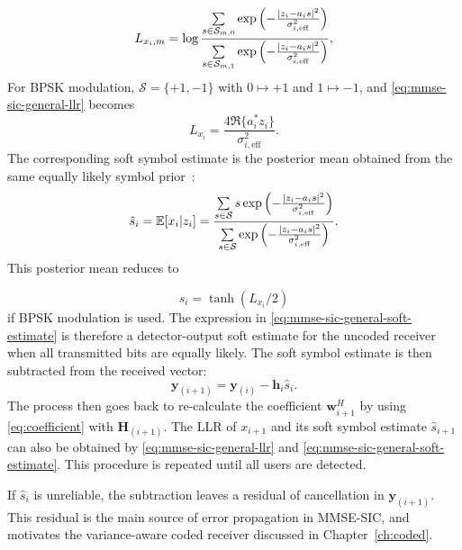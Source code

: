 \begin{equation}
    L_{x_i,m}
    =
    \log
    \frac{
    \sum\limits_{s\in\mathcal{S}_{m,0}}
    \exp\left(-\frac{\abs{z_i-a_i s}^2}{\sigma^2_{i,\mathrm{eff}}}\right)}
    {\sum\limits_{s\in\mathcal{S}_{m,1}}
    \exp\left(-\frac{\abs{z_i-a_i s}^2}{\sigma^2_{i,\mathrm{eff}}}\right)},
    \label{eq:mmse-sic-general-llr}
\end{equation}
For BPSK modulation, $\mathcal{S}=\{+1,-1\}$ with $0\mapsto +1$ and $1\mapsto -1$, and \eqref{eq:mmse-sic-general-llr} becomes
\begin{equation}
    L_{x_i}
    =
    \frac{4\Re\{a_i^* z_i\}}{\sigma^2_{i,\mathrm{eff}}}.
\end{equation}
The corresponding soft symbol estimate is the posterior mean obtained from the same equally likely symbol prior~\cite{shapiro2005soft}:
\begin{equation}
    \hat{s}_i
    =
    \mathbb{E}[x_i|z_i]
    =
    \frac{
    \sum\limits_{s\in\mathcal{S}} s
    \exp\left(-\frac{\abs{z_i-a_i s}^2}{\sigma^2_{i,\mathrm{eff}}}\right)}
    {
    \sum\limits_{s\in\mathcal{S}}
    \exp\left(-\frac{\abs{z_i-a_i s}^2}{\sigma^2_{i,\mathrm{eff}}}\right)}.
    \label{eq:mmse-sic-general-soft-estimate}
\end{equation}
This posterior mean reduces to

\begin{equation}
\hat{s}_i=\tanh(L_{x_i}/2)
\end{equation}
if BPSK modulation is used. 
The expression in \eqref{eq:mmse-sic-general-soft-estimate} is therefore a detector-output soft estimate for the uncoded receiver when all transmitted bits are equally likely. 
The soft symbol estimate is then subtracted from the received vector:
\begin{equation}
    \bm{y}_{(i+1)}=\bm{y}_{(i)}-\bm{h}_i\hat{s}_i .
\end{equation}
The process then goes back to re-calculate the coefficient $\bm{w}_{i+1}^H$ by using \eqref{eq:coefficient} with $\bm{H}_{(i+1)}$. The LLR of $x_{i+1}$ and its soft symbol estimate $\hat{s}_{i+1}$ can also be obtained by \eqref{eq:mmse-sic-general-llr} and \eqref{eq:mmse-sic-general-soft-estimate}. This procedure is repeated until all users are detected.

If $\hat{s}_i$ is unreliable, the subtraction leaves a residual of cancellation  in $\bm{y}_{(i+1)}$. This residual is the main source of error propagation in MMSE-SIC, and motivates the variance-aware coded receiver discussed in Chapter~\ref{ch:coded}.

